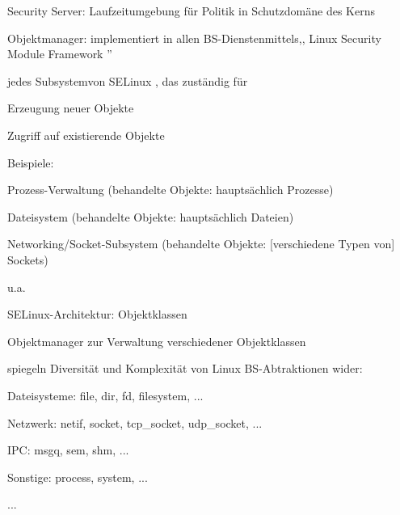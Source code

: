 \documentclass[a4paper]{article}
\begin{document}
\begin{multicols}{3}
    \begin{itemize*}
        \item
        Security Server: Laufzeitumgebung für Politik in Schutzdomäne des
        Kerns
        \item
        Objektmanager: implementiert in allen BS-Dienstenmittels,, Linux
        Security Module Framework ''
        \begin{itemize*}
            \item jedes Subsystemvon SELinux , das zuständig für \begin{enumerate*}  \item   Erzeugung neuer Objekte \item   Zugriff auf existierende Objekte \end{enumerate*}
            \item Beispiele: \begin{enumerate*}  \item   Prozess-Verwaltung (behandelte Objekte: hauptsächlich Prozesse) \item   Dateisystem (behandelte Objekte: hauptsächlich Dateien) \item   Networking/Socket-Subsystem (behandelte Objekte: {[}verschiedene   Typen von{]} Sockets) \item   u.a. \end{enumerate*}
        \end{itemize*}
    \end{itemize*}

    SELinux-Architektur: Objektklassen

    \begin{itemize*}
        \item
        Objektmanager zur Verwaltung verschiedener Objektklassen
        \item
        spiegeln Diversität und Komplexität von Linux BS-Abtraktionen wider:
        \begin{itemize*}
            \item Dateisysteme: file, dir, fd, filesystem, ...
            \item Netzwerk: netif, socket, tcp\_socket, udp\_socket, ...
            \item IPC: msgq, sem, shm, ...
            \item Sonstige: process, system, ...
            \item ...
        \end{itemize*}
    \end{itemize*}


\end{multicols}
\end{document}
